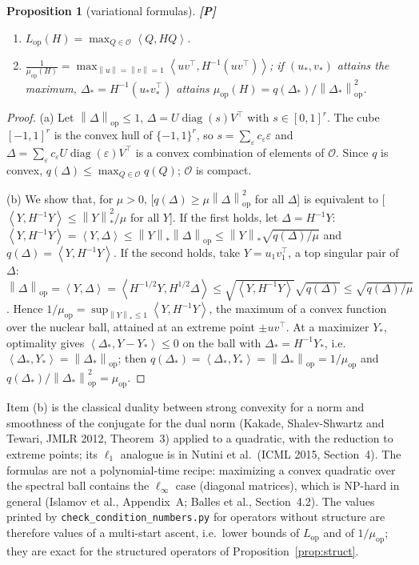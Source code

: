 \documentclass[11pt]{article}
\newtheorem{proposition}[theorem]{Proposition}
\theoremstyle{definition}
\theoremstyle{remark}
\newcommand{\norm}[1]{\left\|#1\right\|}
\newcommand{\nop}[1]{\left\|#1\right\|_{\mathrm{op}}}
\newcommand{\nnuc}[1]{\left\|#1\right\|_{*}}
\newcommand{\inner}[2]{\left\langle #1, #2 \right\rangle}
\newcommand{\diag}{\operatorname{diag}}
\newcommand{\Lop}{L_{\mathrm{op}}}
\newcommand{\muop}{\mu_{\mathrm{op}}}
\newcommand{\cO}{\mathcal{O}}
\begin{document}
\begin{proposition}[variational formulas]\label{prop:var} \textbf{[P]}
\begin{enumerate}[label=(\alph*)]
\item $\displaystyle \Lop(H)=\max_{Q\in\cO}\inner{Q}{HQ}$.
\item $\displaystyle \frac1{\muop(H)}=\max_{\norm u=\norm v=1}\inner{uv^\top}{H^{-1}(uv^\top)}$; if $(u_\ast,v_\ast)$
attains the maximum, $\Delta_\ast=H^{-1}(u_\ast v_\ast^\top)$ attains $\muop(H)=q(\Delta_\ast)/\nop{\Delta_\ast}^2$.
\end{enumerate}
\end{proposition}
\begin{proof}
(a) Let $\nop\Delta\le1$, $\Delta=U\diag(s)V^\top$ with $s\in[0,1]^r$. The cube $[-1,1]^r$ is the convex hull of
$\{-1,1\}^r$, so $s=\sum_\varepsilon c_\varepsilon\varepsilon$ and $\Delta=\sum_\varepsilon c_\varepsilon U\diag(\varepsilon)V^\top$ is a convex
combination of elements of $\cO$. Since $q$ is convex, $q(\Delta)\le\max_{Q\in\cO}q(Q)$; $\cO$ is compact.

(b) We show that, for $\mu>0$, [$q(\Delta)\ge\mu\nop\Delta^2$ for all $\Delta$] is equivalent to
[$\inner{Y}{H^{-1}Y}\le\nnuc Y^2/\mu$ for all $Y$]. If the first holds, let $\Delta=H^{-1}Y$:
$\inner Y{H^{-1}Y}=\inner Y\Delta\le\nnuc Y\nop\Delta\le\nnuc Y\sqrt{q(\Delta)/\mu}$ and $q(\Delta)=\inner Y{H^{-1}Y}$.
If the second holds, take $Y=u_1v_1^\top$, a top singular pair of $\Delta$:
$\nop\Delta=\inner Y\Delta=\inner{H^{-1/2}Y}{H^{1/2}\Delta}\le\sqrt{\inner Y{H^{-1}Y}}\sqrt{q(\Delta)}\le\sqrt{q(\Delta)/\mu}$.
Hence $1/\muop=\sup_{\nnuc Y\le1}\inner Y{H^{-1}Y}$, the maximum of a convex function over the nuclear ball, attained at
an extreme point $\pm uv^\top$. At a maximizer $Y_\ast$, optimality gives $\inner{\Delta_\ast}{Y-Y_\ast}\le0$ on the ball
with $\Delta_\ast=H^{-1}Y_\ast$, i.e.\ $\inner{\Delta_\ast}{Y_\ast}=\nop{\Delta_\ast}$; then
$q(\Delta_\ast)=\inner{\Delta_\ast}{Y_\ast}=\nop{\Delta_\ast}=1/\muop$ and $q(\Delta_\ast)/\nop{\Delta_\ast}^2=\muop$.
\end{proof}

Item (b) is the classical duality between strong convexity for a norm and smoothness of the conjugate for the dual
norm (Kakade, Shalev-Shwartz and Tewari, JMLR 2012, Theorem~3) applied to a quadratic, with the reduction to extreme
points; its $\ell_1$ analogue is in Nutini et al.\ (ICML 2015, Section~4). The formulas are not a polynomial-time
recipe: maximizing a convex quadratic over the spectral ball contains the $\ell_\infty$ case (diagonal matrices), which
is NP-hard in general (Islamov et al., Appendix~A; Balles et al., Section~4.2). The values printed by
\texttt{check\_condition\_numbers.py} for operators without structure are therefore values of a multi-start ascent, i.e.\
lower bounds of $\Lop$ and of $1/\muop$; they are exact for the structured operators of Proposition~\ref{prop:struct}.
\end{document}
